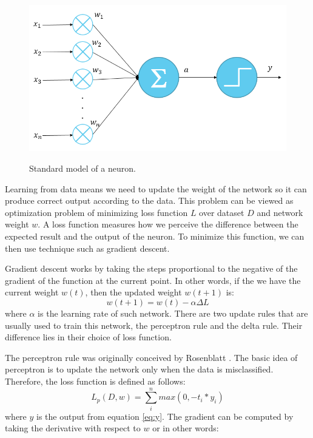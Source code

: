\documentclass[a4paper,11pt]{kth-mag}
\begin{document}
\begin{figure}[h]
\centering
\includegraphics[scale=0.3]{image/neuron.png}
\label{fig:neuron}
\caption{Standard model of a neuron.}
\end{figure}

Learning from data means we need to update the weight of the network so it can produce correct output according to the data. This problem can be viewed as optimization problem of minimizing loss function $L$ over dataset $D$ and network weight $w$. A loss function measures how we perceive the difference between the expected result and the output of the neuron. To minimize this function, we can then use technique such as gradient descent. 

Gradient descent works by taking the steps proportional to the negative of the gradient of the function at the current point. In other words, if the we have the current weight $w(t)$, then the updated weight $w(t+1)$ is:
\begin{equation}
w(t+1) = w(t) - \alpha \Delta L
\end{equation}
where $\alpha$ is the learning rate of such network. There are two update rules that are usually used to train this network, the perceptron rule and the delta rule. Their difference lies in their choice of loss function.

The perceptron rule was originally conceived by Rosenblatt \cite{rosenblatt1975perceptron}. The basic idea of perceptron is to update the network only when the data is misclassified. Therefore, the loss function is defined as follows:
\begin{equation}
L_p(D, w) = \sum^n_i max(0, -t_i*y_i)
\end{equation}
where $y$ is the output from equation \ref{eq:y}. The gradient can be computed by taking the derivative with respect to $w$ or in other words:
\end{document}

